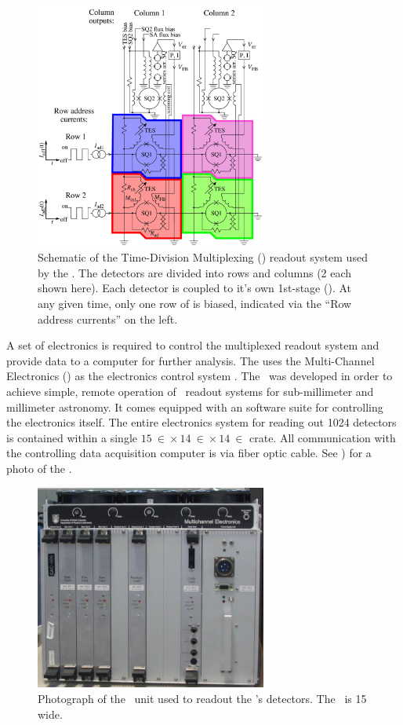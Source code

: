 \begin{figure}
\centering
\includegraphics[width=3in]{images/ch4-tdm-schematic.png}
\caption{
  Schematic of the Time-Division Multiplexing (\TDM) readout system used by the \Imager.
  The detectors are divided into rows and columns (2 each shown here).
  Each detector is coupled to it's own 1st-stage \SQUID ().
  At any given time, only one row of \SQUIDs is biased, indicated via the ``Row address currents'' on the left.
}
\label{fig:ch4-tdm-schematic}
\end{figure}

A set of electronics is required to control the multiplexed readout system and provide data to a computer for further analysis.
The \Imager uses the Multi-Channel Electronics (\MCE) as the electronics control system \cite{battistelli_functional_2008,battistelli_automated_2008,_mcewiki_2014}.
The \MCE\ was developed in order to achieve simple, remote operation of \TDM\ readout systems for sub-millimeter and millimeter astronomy.
It comes equipped with an software suite for controlling the electronics itself.
The entire electronics system for reading out 1024 detectors is contained within a single $\SI{15}{\in} \times \SI{14}{\in} \times \SI{14}{\in}$ crate.
All communication with the controlling data acquisition computer is via fiber optic cable.
See ) for a photo of the \MCE.

\begin{figure}
\centering
\includegraphics[width=3in]{images/ch4-mce.jpg}
\caption{
  Photograph of the \MCE\ unit used to readout the \Imager's detectors.
  The \MCE\ is \SI{15}{\in} wide.
}
\label{fig:ch4-mce-photo}
\end{figure}

